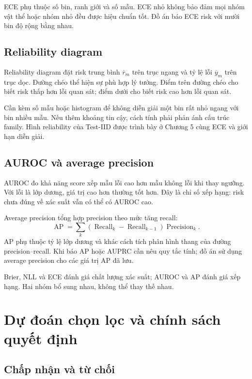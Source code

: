 ECE phụ thuộc số bin, ranh giới và số mẫu. ECE nhỏ không bảo đảm mọi nhóm vật thể hoặc nhóm nhỏ đều được hiệu chuẩn tốt. Đồ án báo ECE risk với mười bin độ rộng bằng nhau.

\subsection{Reliability diagram}

Reliability diagram đặt risk trung bình $\overline{r}_m$ trên trục ngang và tỷ lệ lỗi $\overline{y}_m$ trên trục dọc. Đường chéo thể hiện sự phù hợp lý tưởng. Điểm trên đường chéo cho biết risk thấp hơn lỗi quan sát; điểm dưới cho biết risk cao hơn lỗi quan sát.

Cần kèm số mẫu hoặc histogram để không diễn giải một bin rất nhỏ ngang với bin nhiều mẫu. Nếu thêm khoảng tin cậy, cách tính phải phản ánh cấu trúc family. Hình reliability của Test-IID được trình bày ở Chương 5 cùng ECE và giới hạn diễn giải.

\subsection{AUROC và average precision}

AUROC đo khả năng score xếp mẫu lỗi cao hơn mẫu không lỗi khi thay ngưỡng. Với lỗi là lớp dương, giá trị cao hơn thường tốt hơn. Đây là chỉ số xếp hạng: risk chưa đúng về xác suất vẫn có thể có AUROC cao.

Average precision tổng hợp precision theo mức tăng recall:
\begin{equation}
    \operatorname{AP}=
    \sum_k(\operatorname{Recall}_k-\operatorname{Recall}_{k-1})
                   \operatorname{Precision}_k.
    \label{eq:theory-ap}
\end{equation}
AP phụ thuộc tỷ lệ lớp dương và khác cách tích phân hình thang của đường precision--recall. Khi báo AP hoặc AUPRC cần nêu quy tắc tính; đồ án sử dụng average precision cho các giá trị AP đã lưu.

Brier, NLL và ECE đánh giá chất lượng xác suất; AUROC và AP đánh giá xếp hạng. Hai nhóm bổ sung nhau, không thể thay thế nhau.

\section{Dự đoán chọn lọc và chính sách quyết định}
\label{sec:theory-selective}

\subsection{Chấp nhận và từ chối}

